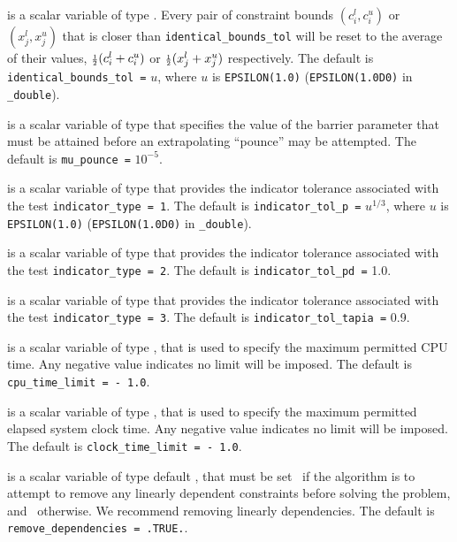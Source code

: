 \begin{description}
is a scalar variable of type \realdp.
Every pair of constraint bounds
$(c_{i}^{l}, c_{i}^{u})$ or $(x_{j}^{l}, x_{j}^{u})$
that is closer than {\tt identical\_bounds\_tol}
will be reset to the average of their values,
${\scriptstyle \frac{1}{2}} (c_{i}^{l} + c_{i}^{u})$ or ${\scriptstyle \frac{1}{2}} (x_{j}^{l} + x_{j}^{u})$
respectively.
The default is {\tt identical\_bounds\_tol =} $u$,
where $u$ is {\tt EPSILON(1.0)} ({\tt EPSILON(1.0D0)} in
{\tt \fullpackagename\_double}).

is a scalar variable of type \realdp that specifies
the value of the barrier parameter that must be attained before an 
extrapolating ``pounce'' may be attempted.
The default is {\tt mu\_pounce =} $10^{-5}$.

is a scalar variable of type \realdp that
provides the indicator tolerance associated with the test
{\tt indicator\_type = 1}.
The default is {\tt indicator\_tol\_p =} $u^{1/3}$,
where $u$ is {\tt EPSILON(1.0)} ({\tt EPSILON(1.0D0)} in
{\tt \fullpackagename\_double}).

is a scalar variable of type \realdp that
provides the indicator tolerance associated with the test
{\tt indicator\_type = 2}.
The default is {\tt indicator\_tol\_pd =} 1.0.

is a scalar variable of type \realdp that
provides the indicator tolerance associated with the test
{\tt indicator\_type = 3}.
The default is {\tt indicator\_tol\-\_tapia =} 0.9.

 is a scalar variable of type \realdp,
that is used to specify the maximum permitted CPU time. Any negative
value indicates no limit will be imposed. The default is
{\tt cpu\_time\_limit = - 1.0}.

 is a scalar variable of type \realdp,
that is used to specify the maximum permitted elapsed system clock time.
Any negative value indicates no limit will be imposed. The default is
{\tt clock\_time\_limit = - 1.0}.

 is a scalar variable of type
default \logical, that must be set \true\ if the algorithm
is to attempt to remove any linearly dependent constraints before
solving the problem, and \false\ otherwise.
We recommend removing linearly dependencies.
The default is {\tt remove\_dependencies = .TRUE.}.


\end{description}
